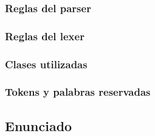 \subsubsection{Reglas del parser}


\subsubsection{Reglas del lexer}


\subsubsection{Clases utilizadas}


\subsubsection{Tokens y palabras reservadas}





\subsection{Enunciado}

